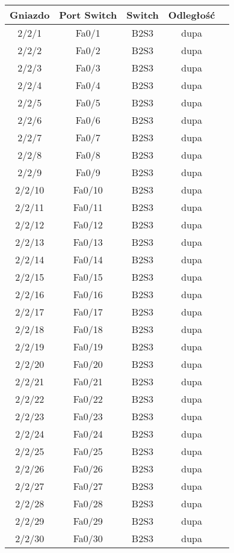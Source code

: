 \begin{center}
    \begin{longtable}{|c|c|c|c|c|}
    \hline
    Gniazdo & Port Switch & Switch & Odległość \\ \hline
	2/2/1 & Fa0/1 & B2S3 & dupa \\ \hline
	2/2/2 & Fa0/2 & B2S3 & dupa \\ \hline
	2/2/3 & Fa0/3 & B2S3 & dupa \\ \hline
	2/2/4 & Fa0/4 & B2S3 & dupa \\ \hline
	2/2/5 & Fa0/5 & B2S3 & dupa \\ \hline
	2/2/6 & Fa0/6 & B2S3 & dupa \\ \hline
	2/2/7 & Fa0/7 & B2S3 & dupa \\ \hline
	2/2/8 & Fa0/8 & B2S3 & dupa \\ \hline
	2/2/9 & Fa0/9 & B2S3 & dupa \\ \hline
	2/2/10 & Fa0/10 & B2S3 & dupa \\ \hline
	2/2/11 & Fa0/11 & B2S3 & dupa \\ \hline
	2/2/12 & Fa0/12 & B2S3 & dupa \\ \hline
	2/2/13 & Fa0/13 & B2S3 & dupa \\ \hline
	2/2/14 & Fa0/14 & B2S3 & dupa \\ \hline
	2/2/15 & Fa0/15 & B2S3 & dupa \\ \hline
	2/2/16 & Fa0/16 & B2S3 & dupa \\ \hline
	2/2/17 & Fa0/17 & B2S3 & dupa \\ \hline
	2/2/18 & Fa0/18 & B2S3 & dupa \\ \hline
	2/2/19 & Fa0/19 & B2S3 & dupa \\ \hline
	2/2/20 & Fa0/20 & B2S3 & dupa \\ \hline
	2/2/21 & Fa0/21 & B2S3 & dupa \\ \hline
	2/2/22 & Fa0/22 & B2S3 & dupa \\ \hline
	2/2/23 & Fa0/23 & B2S3 & dupa \\ \hline
	2/2/24 & Fa0/24 & B2S3 & dupa \\ \hline
	2/2/25 & Fa0/25 & B2S3 & dupa \\ \hline
	2/2/26 & Fa0/26 & B2S3 & dupa \\ \hline
	2/2/27 & Fa0/27 & B2S3 & dupa \\ \hline
	2/2/28 & Fa0/28 & B2S3 & dupa \\ \hline
	2/2/29 & Fa0/29 & B2S3 & dupa \\ \hline
	2/2/30 & Fa0/30 & B2S3 & dupa \\ \hline

\end{longtable}
\end{center}
